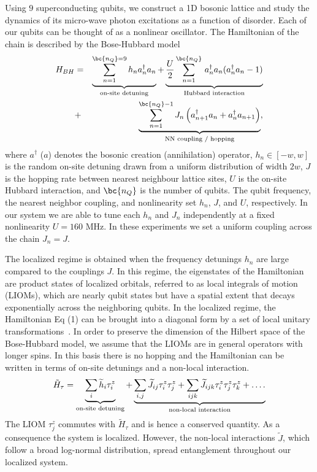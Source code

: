 Using $9$  superconducting qubits, we construct a 1D bosonic lattice and study the dynamics of its micro-wave photon excitations as a function of disorder.
Each of our qubits can be thought of as a nonlinear oscillator. The Hamiltonian of the chain is described by the Bose-Hubbard model
\vspace{-8pt}
\begin{eqnarray}
    H_{BH} &=& \underbrace{\sum\limits_{n=1}^{\bc{n_Q} = 9} h_n a^{\dagger}_{n}a_{n}}_{\text{on-site detuning}} +
    \underbrace{\frac{U}{2}\sum\limits_{n=1}^{\bc{n_Q}} \,a^{\dagger}_{n}a_n(a^{\dagger}_{n}a_n-1)}_{\text{Hubbard interaction}} \nonumber \\
    &+& \underbrace{\sum_{n=1}^{\bc{n_Q}-1}J_n \left( a^{\dagger}_{n+1}a_n+a^{\dagger}_{n}a_{n+1} \right) }_{\text{NN coupling / hopping}},
\end{eqnarray}
\noindent
where $a^{\dagger}$ ($a$) denotes the bosonic creation (annihilation) operator, $h_n\in \left[ -w, w \right]$ is the random on-site detuning drawn from a uniform distribution of width $2w$,
$J$ is the hopping rate between nearest neighbour lattice sites, $U$ is the on-site Hubbard interaction, and $\bc{n_Q}$ is the number of qubits.
The qubit frequency, the nearest neighbor coupling, and nonlinearity set $h_n$, $J$, and $U$, respectively.
In our system we are able to tune each $h_n$ and $J_n$ independently at a fixed nonlinearity $U=160$ MHz.
In these experiments we set a uniform coupling across the chain $J_n = J$.

The localized regime is obtained when the frequency detunings $h_n$ are large compared to the couplings $J$.
In this regime, the eigenstates of the Hamiltonian are product states of localized orbitals, referred to as local integrals of motion (LIOMs), which are nearly qubit states but have a spatial extent that decays exponentially across the neighboring qubits.
In the localized regime, the Hamiltonian Eq (1) can be brought into a diagonal form by a set of local unitary transformations~\autocite{Serbyn2013, Huse2014}.
In order to preserve the dimension of the Hilbert space of the Bose-Hubbard model, we assume that the LIOMs are in general operators with longer spins.
In this basis there is no hopping and the Hamiltonian can be written in terms of on-site detunings and a non-local interaction.
\begin{equation}
    \tilde{H}_{\tau} = \underbrace{\sum_i \widetilde{h}_i \tau^z_i}_{\text{on-site detuning}} + \underbrace{ \sum_{i,j} \widetilde{J}_{ij}\tau^z_i\tau^z_j + \sum_{ijk} \widetilde{J}_{ijk}\tau^z_i\tau^z_j\tau^z_k + \mathellipsis.}_{\text{non-local interaction}}%
\end{equation}
The LIOM $\tau^z_j$ commutes with $\tilde H_{\tau}$ and is hence a conserved quantity. As a consequence the system is localized.
However, the non-local interactions $\widetilde{J}$, which follow a broad log-normal distribution,\autocite{Varma2019} spread entanglement throughout our localized system.

